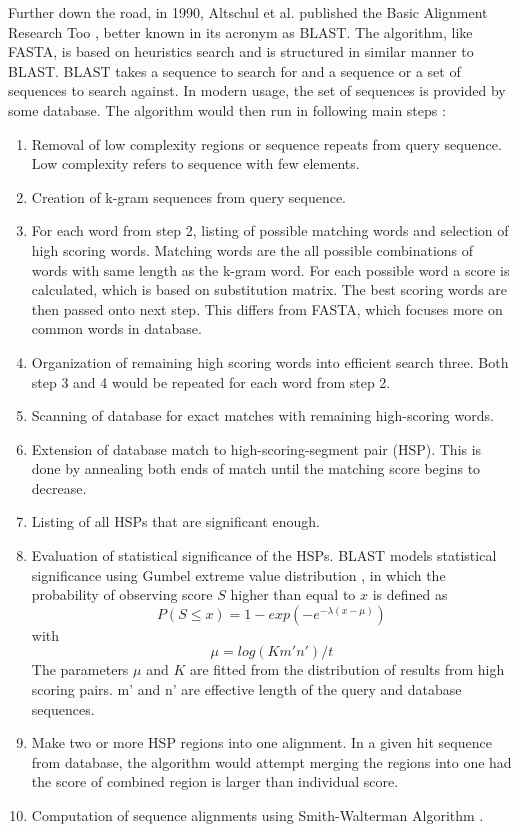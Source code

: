 Further down the road, in 1990, Altschul et al. published the Basic Alignment Research Too \citep{Altschul90}, better known in its acronym as BLAST. The algorithm, like FASTA, is based on heuristics search and is structured in similar manner to BLAST. BLAST takes a sequence to search for and a sequence or a set of sequences to search against. In modern usage, the set of sequences is provided by some database. The algorithm would then run in following main steps \citep{mount2001bioinformatics}:

\begin{enumerate}
\item Removal of low complexity regions or sequence repeats from query sequence. Low complexity refers to sequence with few elements.
\item Creation of k-gram sequences from query sequence.
\item For each word from step 2, listing of possible matching words and selection of high scoring words. Matching words are the all possible combinations of words with same length as the k-gram word. For each possible word a score is calculated, which is based on substitution matrix. The best scoring words are then passed onto next step. This differs from FASTA, which focuses more on common words in database.
\item Organization of remaining high scoring words into efficient search three. Both step 3 and 4 would be repeated for each word from step 2.
\item Scanning of database for exact matches with remaining high-scoring words.
\item Extension of database match to high-scoring-segment pair (HSP). This is done by annealing both ends of match until the matching score begins to decrease.
\item Listing of all HSPs that are significant enough.
\item Evaluation of statistical significance of the HSPs. BLAST models statistical significance using Gumbel extreme value distribution \citep{gumbel1954statistical}, in which the probability of observing score $S$ higher than equal to $x$ is defined as $$P(S \leq x) = 1 - exp(-e^{- \lambda (x - \mu)})$$ with $$\mu = log(Km'n')/t$$ The parameters $\mu$ and $K$ are fitted from the distribution of results from high scoring pairs. m' and n' are effective length of the query and database sequences.
\item Make two or more HSP regions into one alignment. In a given hit sequence from database, the algorithm would attempt merging the regions into one had the score of combined region is larger than individual score.
\item Computation of sequence alignments using Smith-Walterman Algorithm \citep{smith1981identification}.
\end{enumerate}

